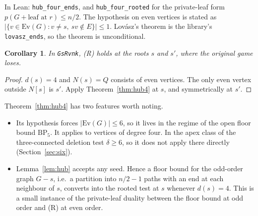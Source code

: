 \documentclass[11pt]{amsart}
\newtheorem{corollary}[theorem]{Corollary}
\theoremstyle{definition}
\newcommand{\Ev}{\mathrm{Ev}}
\begin{document}
In Lean: \texttt{hub\_four\_ends}, and \texttt{hub\_four\_rooted} for the private-leaf form
$p(G+\text{leaf at }r)\le n/2$. The hypothesis on even vertices is stated as
$|\{v\in\Ev(G):v\ne s,\ sv\notin E\}|\le1$. Lov\'asz's theorem is the library's
\texttt{lovasz\_ends}, so the theorem is unconditional.

\begin{corollary}\label{cor:GsRvnk}
In \texttt{GsRvnk}, (R) holds at the roots $s$ and $s'$, where the original game loses.
\end{corollary}
\begin{proof}
$d(s)=4$ and $N(s)=Q$ consists of even vertices. The only even vertex outside $N[s]$ is $s'$.
Apply Theorem~\ref{thm:hub4} at $s$, and symmetrically at $s'$.
\end{proof}

Theorem~\ref{thm:hub4} has two features worth noting.
\begin{itemize}
\item Its hypothesis forces $|\Ev(G)|\le6$, so it lives in the regime of the open floor bound
$\mathrm{BP}_5$. It applies to vertices of degree four. In the apex class of the three-connected
deletion test $\delta\ge6$, so it does not apply there directly (Section~\ref{sec:six}).
\item Lemma~\ref{lem:hub} accepts any seed. Hence a floor bound for the odd-order graph $G-s$,
i.e.\ a partition into $n/2-1$ paths with an end at each neighbour of $s$, converts into the
rooted test at $s$ whenever $d(s)=4$. This is a small instance of the private-leaf duality
between the floor bound at odd order and (R) at even order.
\end{itemize}
\end{document}
